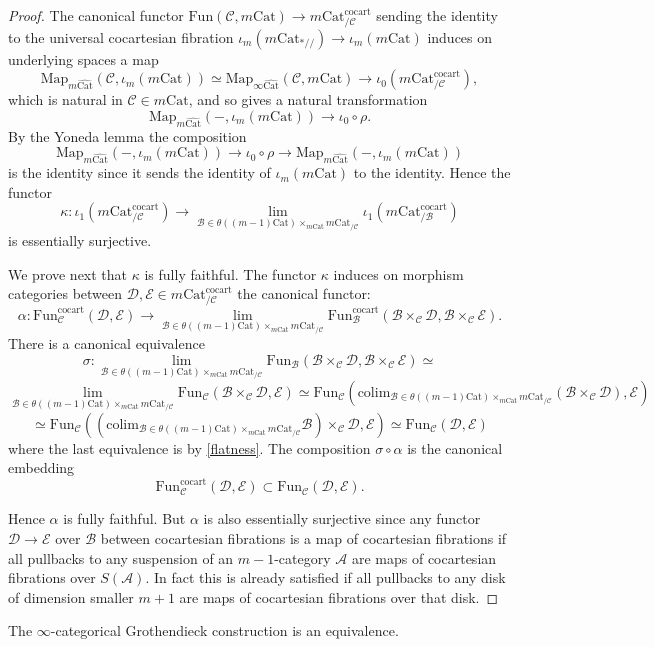 \documentclass[10pt,oneside]{article}
\numberwithin{equation}{section} %
\numberwithin{figure}{section} %
\theoremstyle{plain}
\theoremstyle{definition}
\newcommand{\mA}{{\mathcal A}}
\newcommand{\mB}{{\mathcal B}}
\newcommand{\mC}{{\mathcal C}}
\newcommand{\mD}{{\mathcal D}}
\newcommand{\mE}{{\mathcal E}}
\newcommand{\m}{{m}}
\newcommand{\colim}{\mathrm{colim}}
\newcommand{\Cat}{\mathrm{Cat}}
\newcommand{\Fun}{\mathrm{Fun}}
\newcommand{\cocart}{{\mathrm{cocart}}}
\newcommand{\Map}{{\mathrm{Map}}}
\begin{document}
\begin{proof}
The canonical functor $\Fun(\mC, m\Cat) \to m\Cat^\cocart_{/\mC}$
sending the identity to the universal cocartesian fibration $  \iota_m(m\Cat_{*//}) \to  \iota_m(m\Cat) $
induces on underlying spaces a map
$$\Map_{\m\widehat{\Cat}}(\mC, \iota_m(m\Cat)) \simeq \Map_{\infty\widehat{\Cat}}(\mC, m\Cat) \to \iota_0(m\Cat^\cocart_{/\mC}), $$
which is natural in $\mC \in {m\Cat}$,
and so gives a natural transformation $$\Map_{\m\widehat{\Cat}}(-, \iota_m(m\Cat)) \to \iota_0 \circ \rho .$$
By the Yoneda lemma the composition 
$$\Map_{\m\widehat{\Cat}}(-, \iota_m(m\Cat)) \to \iota_0 \circ \rho \to \Map_{\m\widehat{\Cat}}(-, \iota_m(m\Cat)) $$
is the identity since it sends the identity of $ \iota_m(m\Cat)$ to the identity.
Hence the functor 
$$\kappa: \iota_1(m\Cat^\cocart_{/\mC}) \to \lim_{\mB \in \theta((m-1)\Cat) \times_{m\Cat} m\Cat_{/\mC}}\iota_1(m\Cat^\cocart_{/\mB})$$ is essentially surjective.

We prove next that $\kappa$ is fully faithful.
The functor $\kappa$ induces on morphism categories between $\mD, \mE \in m\Cat^\cocart_{/\mC}$
the canonical functor:
$$ \alpha: \Fun^\cocart_\mC(\mD,\mE) \to \lim_{\mB \in \theta((m-1)\Cat) \times_{m\Cat} m\Cat_{/\mC}} \Fun^\cocart_\mB(\mB \times_\mC \mD, \mB \times_\mC \mE).$$
There is a canonical equivalence
$$\sigma: \lim_{\mB \in \theta((m-1)\Cat) \times_{m\Cat} m\Cat_{/\mC}} \Fun_\mB(\mB \times_\mC \mD, \mB \times_\mC \mE) \simeq $$
$$  \lim_{\mB \in \theta((m-1)\Cat) \times_{m\Cat} m\Cat_{/\mC}} \Fun_\mC(\mB \times_\mC \mD, \mE) \simeq \Fun_\mC(\colim_{\mB \in \theta((m-1)\Cat) \times_{m\Cat} m\Cat_{/\mC}} (\mB \times_\mC \mD), \mE)$$
$$ \simeq \Fun_\mC((\colim_{\mB \in \theta((m-1)\Cat) \times_{m\Cat} m\Cat_{/\mC}}\mB) \times_\mC \mD, \mE) \simeq \Fun_\mC(\mD, \mE)$$
where the last equivalence is by \cref{flatness}.
The composition $\sigma \circ \alpha $ is the canonical embedding
$$\Fun^\cocart_\mC(\mD,\mE) \subset \Fun_\mC(\mD,\mE).$$

Hence $\alpha$ is fully faithful. But $\alpha$ is also essentially surjective since any functor $\mD \to \mE$ over $\mB$
between cocartesian fibrations is a map of cocartesian fibrations if
all pullbacks to any suspension of an $m-1$-category $\mA$ are maps of
cocartesian fibrations over $S(\mA).$
In fact this is already satisfied if all pullbacks to any 
disk of dimension smaller $m+1$ are maps of cocartesian fibrations over that disk.
\end{proof}

\begin{theorem}\label{Groeq}
The $\infty$-categorical Grothendieck construction is an equivalence.

\end{theorem}
\end{document}
